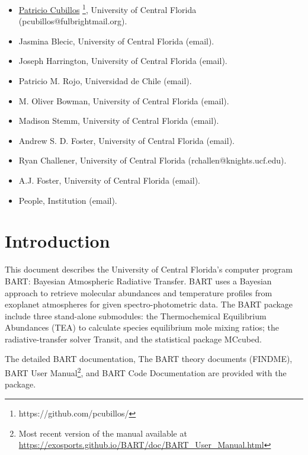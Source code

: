\documentclass[letterpaper, 12pt]{article}
\begin{document}
\begin{itemize}
\item \href{https://github.com/pcubillos/}{Patricio Cubillos}%
  \footnote{https://github.com/pcubillos/}, University of
  Central Florida (pcubillos@fulbrightmail.org).
\item Jasmina Blecic, University of Central Florida (email).
\item Joseph Harrington, University of Central Florida (email).
\item Patricio M. Rojo, Universidad de Chile (email).
\item M. Oliver Bowman, University of Central Florida (email).
\item Madison Stemm, University of Central Florida (email).
\item Andrew S. D. Foster, University of Central Florida (email).
\item Ryan Challener, University of Central Florida (rchallen@knights.ucf.edu).
\item A.J. Foster, University of Central Florida (email).
\item People, Institution (email).
\end{itemize}

\section{Introduction}
\label{sec:theory}

This document describes the University of Central Florida's computer
program BART: Bayesian Atmospheric Radiative Transfer.  BART uses a
Bayesian approach to retrieve molecular abundances and temperature
profiles from exoplanet atmospheres for given spectro-photometric
data.  The BART package include three stand-alone submodules: the
Thermochemical Equilibrium Abundances (TEA) to calculate species
equilibrium mole mixing ratios; the radiative-transfer solver Transit,
and the statistical package MCcubed.


The detailed BART documentation, The BART theory documents (FINDME),
BART User Manual\footnote{Most recent version of the manual available at 
\href{https://exosports.github.io/BART/doc/BART_User_Manual.html}{https://exosports.github.io/BART/doc/BART\_User\_Manual.html}}, 
and BART Code Documentation are provided with the
package.
\end{document}

